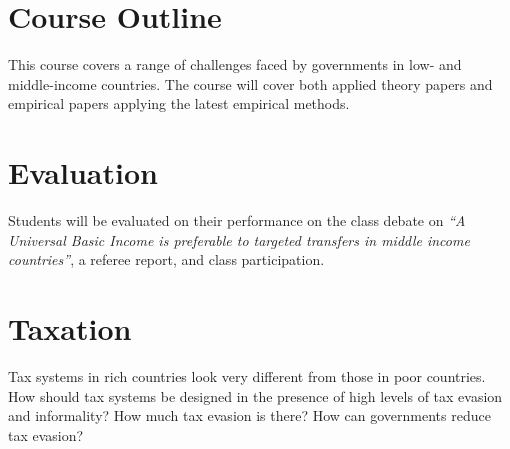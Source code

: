 \documentclass{article}
\begin{document}
\section*{Course Outline}

This course covers a range of challenges faced by governments in low- and middle-income countries. The course will cover both applied theory papers and empirical papers applying the latest empirical methods.

\section*{Evaluation}

Students will be evaluated on their performance on the class debate on \emph{``A Universal Basic Income is preferable to targeted transfers in middle income countries''}, a referee report, and class participation.

\section{Taxation}
Tax systems in rich countries look very different from those in poor countries. How should tax systems be designed in the presence of high levels of tax evasion and informality? How much tax evasion is there? How can governments reduce tax evasion?
\end{document}
